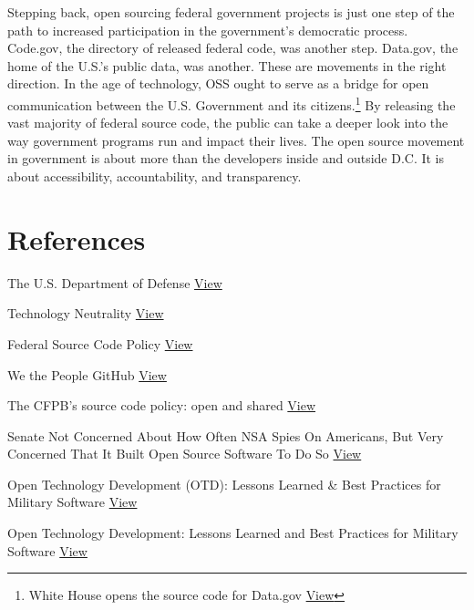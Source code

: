 \documentclass[a4paper]{article}
\begin{document}
Stepping back, open sourcing federal government projects is just one step of the path to increased participation in the government's democratic process. Code.gov, the directory of released federal code, was another step. Data.gov, the home of the U.S.'s public data, was another. These are movements in the right direction. In the age of technology, OSS ought to serve as a bridge for open communication between the U.S. Government and its citizens.\footnote{White House opens the source code for Data.gov \href{https://gcn.com/articles/2011/12/08/datagov-goes-open-source-with-code.aspx}{View}} By releasing the vast majority of federal source code, the public can take a deeper look into the way government programs run and impact their lives. The open source movement in government is about more than the developers inside and outside D.C. It is about accessibility, accountability, and transparency.

\pagebreak
\section*{References}

The U.S. Department of Defense \href{https://www.defense.gov/}{View}

Technology Neutrality \href{https://obamawhitehouse.archives.gov/sites/default/files/omb/memoranda/2016/m_16_21.pdf}{View}

Federal Source Code Policy \href{sourcecode.cio.gov}{View}

We the People GitHub \href{https://github.com/WhiteHouse/petitions}{View}

The CFPB’s source code policy: open and shared \href{https://www.consumerfinance.gov/about-us/blog/the-cfpbs-source-code-policy-open-and-shared/}{View}

Senate Not Concerned About How Often NSA Spies On Americans, But Very Concerned That It Built Open Source Software To Do So \href{https://www.techdirt.com/articles/20120717/16542919736/senate-not-concerned-about-how-often-nsa-spies-americans-very-concerned-that-it-built-open-source-software-to-do-so.shtml}{View}

Open Technology Development (OTD): Lessons Learned \& Best Practices for Military Software \href{http://dodcio.defense.gov/Portals/0/Documents/FOSS/OTD-lessons-learned-military-signed.pdf}{View}

Open Technology Development: Lessons Learned and Best Practices for Military Software \href{https://www.netaction.org/opensrc/oss-advantages.html}{View}
\end{document}
